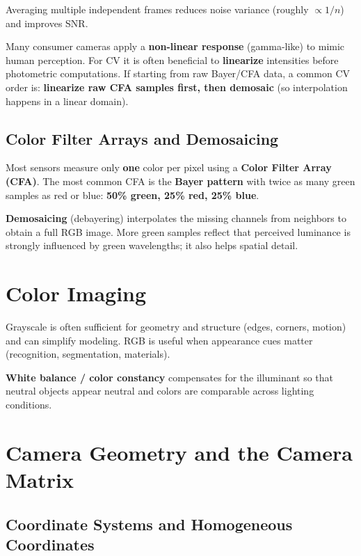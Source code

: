 \documentclass[11pt, oneside]{book}
\begin{document}
Averaging multiple independent frames reduces noise variance (roughly $\propto 1/n$) and improves SNR.

Many consumer cameras apply a \textbf{non-linear response} (gamma-like) to mimic human perception.
For CV it is often beneficial to \textbf{linearize} intensities before photometric computations.
If starting from raw Bayer/CFA data, a common CV order is: \textbf{linearize raw CFA samples first, then demosaic}
(so interpolation happens in a linear domain).

\subsection{Color Filter Arrays and Demosaicing}

\begin{defbox}[title={Color Filter Array}]
Most sensors measure only \textbf{one} color per pixel using a \textbf{Color Filter Array (CFA)}.
The most common CFA is the \textbf{Bayer pattern} with twice as many green samples as red or blue:
\textbf{50\% green, 25\% red, 25\% blue}.
\end{defbox}

\textbf{Demosaicing} (debayering) interpolates the missing channels from neighbors to obtain a full RGB image.
More green samples reflect that perceived luminance is strongly influenced by green wavelengths; it also helps spatial detail.

\section{Color Imaging}

Grayscale is often sufficient for geometry and structure (edges, corners, motion) and can simplify modeling.
RGB is useful when appearance cues matter (recognition, segmentation, materials).

\textbf{White balance / color constancy} compensates for the illuminant so that neutral objects appear neutral
and colors are comparable across lighting conditions.

\section{Camera Geometry and the Camera Matrix}

\subsection{Coordinate Systems and Homogeneous Coordinates}
\end{document}
